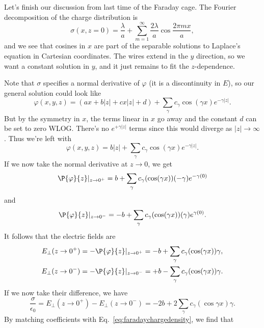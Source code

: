 Let's finish our discussion from last time of the Faraday cage. The Fourier decomposition of the charge distribution is
\begin{equation}
    \sigma(x,z=0) = \frac{\lambda}{a} + \sum_{m=1}^\infty \frac{2\lambda}{a} \cos \frac{2\pi mx}{a},\label{eq:faradaychargedensity}
\end{equation}
and we see that cosines in $x$ are part of the separable solutions to Laplace's equation in Cartesian coordinates. The wires extend in the $y$ direction, so we want a constant solution in $y$, and it just remains to fit the $z$-dependence.

Note that $\sigma$ specifies a normal derivative of $\varphi$ (it is a discontinuity in $E$), so our general solution could look like
\begin{equation}
    \varphi(x,y,z) = (ax+ b|z| +cx|z| + d) + \sum_\gamma c_\gamma \cos(\gamma x) e^{-\gamma|z|}.
\end{equation}
But by the symmetry in $x$, the terms linear in $x$ go away and the constant $d$ can be set to zero WLOG. There's no $e^{+\gamma|z|}$ terms since this would diverge as $|z|\to \infty$. Thus we're left with
\begin{equation}
    \varphi(x,y,z) = b|z| + \sum_\gamma c_\gamma \cos(\gamma x) e^{-\gamma|z|}.
\end{equation}
If we now take the normal derivative at $z\to 0$, we get
\begin{equation}
    \P{\varphi}{z}|_{z\to 0^+} =b+ \sum_\gamma c_\gamma(\cos(\gamma x)) (-\gamma) e^{-\gamma(0)}
\end{equation}
and 
\begin{equation}
    \P{\varphi}{z}|_{z\to 0^-} =-b+ \sum_\gamma c_\gamma(\cos(\gamma x)) (\gamma) e^{\gamma(0)}.
\end{equation}
It follows that the electric fields are
\begin{gather}
    E_\perp(z\to 0^+) = -\P{\varphi}{z}|_{z\to 0^+} = - b+  \sum_\gamma c_\gamma(\cos(\gamma x)) \gamma,\\
    E_\perp(z\to 0^-) = -\P{\varphi}{z}|_{z\to 0^-} = +b - \sum_\gamma c_\gamma(\cos(\gamma x)) \gamma.
\end{gather}
If we now take their difference, we have
\begin{equation}
    \frac{\sigma}{\epsilon_0} = E_\perp(z\to 0^+) - E_\perp(z\to 0^-) = -2b + 2 \sum_\gamma c_\gamma(\cos\gamma x) \gamma.
\end{equation}
By matching coefficients with Eq.~\eqref{eq:faradaychargedensity}, we find that
